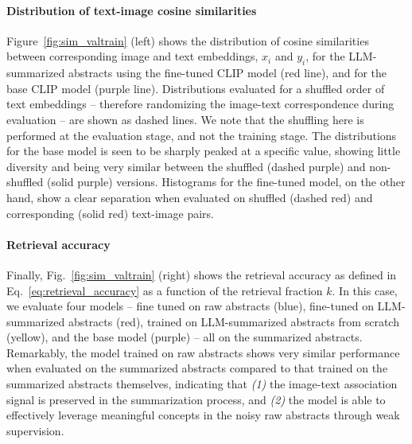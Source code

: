 \documentclass[10pt]{article} %
\begin{document}
\paragraph*{Distribution of text-image cosine similarities}

Figure~\ref{fig:sim_valtrain} (left) shows the distribution of cosine similarities between corresponding image and text embeddings, $x_i$ and $y_i$, for the LLM-summarized abstracts using the fine-tuned CLIP model (red line), and for the base CLIP model (purple line).
%
Distributions evaluated for a shuffled order of text embeddings -- therefore randomizing the image-text correspondence during evaluation -- are shown as dashed lines. We note that the shuffling here is performed at the evaluation stage, and not the training stage.
%
The distributions for the base model is seen to be sharply peaked at a specific value, showing little diversity and being very similar between the shuffled (dashed purple) and non-shuffled (solid purple) versions. 
%
Histograms for the fine-tuned model, on the other hand, show a clear separation when evaluated on shuffled (dashed red) and corresponding (solid red) text-image pairs.


\paragraph*{Retrieval accuracy}

Finally, Fig.~\ref{fig:sim_valtrain} (right) shows the retrieval accuracy as defined in Eq.~\ref{eq:retrieval_accuracy} as a function of the retrieval fraction $k$.
%
In this case, we evaluate four models -- fine tuned on raw abstracts (blue), fine-tuned on LLM-summarized abstracts (red), trained on LLM-summarized abstracts from scratch (yellow), and the base model (purple) -- all on the summarized abstracts.
%
Remarkably, the model trained on raw abstracts shows very similar performance when evaluated on the summarized abstracts compared to that trained on the summarized abstracts themselves, indicating that \emph{(1)} the image-text association signal is preserved in the summarization process, and \emph{(2)} the model is able to effectively leverage meaningful concepts in the noisy raw abstracts through weak supervision.
\end{document}
